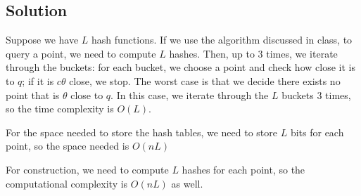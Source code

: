 \begin{enumerate}
  \subsection*{Solution}

  Suppose we have $L$ hash functions. If we use the algorithm discussed in
  class, to query a point, we need to compute $L$ hashes. Then, up to $3$ times,
  we iterate through the buckets: for each bucket, we choose a point and check
  how close it is to $q$; if it is $c\theta$ close, we stop. The worst case is
  that we decide there exists no point that is $\theta$ close to $q$. In this
  case, we iterate through the $L$ buckets $3$ times, so the time complexity is
  $O(L)$.
  
  For the space needed to store the hash tables, we need to store $L$ bits for
  each point, so the space needed is $O(nL)$
  
  For construction, we need to compute $L$ hashes for each point, so the
  computational complexity is $O(nL)$ as well.  
\end{enumerate}
